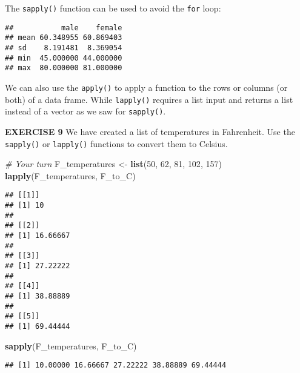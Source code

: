 \documentclass[
]{article}
\newenvironment{Shaded}{\begin{snugshade}}{\end{snugshade}}
\newcommand{\CommentTok}[1]{\textcolor[rgb]{0.56,0.35,0.01}{\textit{#1}}}
\newcommand{\DecValTok}[1]{\textcolor[rgb]{0.00,0.00,0.81}{#1}}
\newcommand{\KeywordTok}[1]{\textcolor[rgb]{0.13,0.29,0.53}{\textbf{#1}}}
\newcommand{\NormalTok}[1]{#1}
\newcommand{\OperatorTok}[1]{\textcolor[rgb]{0.81,0.36,0.00}{\textbf{#1}}}
\newcommand{\StringTok}[1]{\textcolor[rgb]{0.31,0.60,0.02}{#1}}
\begin{document}
The \texttt{sapply()} function can be used to avoid the \texttt{for}
loop:

\begin{Shaded}
\end{Shaded}

\begin{verbatim}
##           male    female
## mean 60.348955 60.869403
## sd    8.191481  8.369054
## min  45.000000 44.000000
## max  80.000000 81.000000
\end{verbatim}

We can also use the \texttt{apply()} to apply a function to the rows or
columns (or both) of a data frame. While \texttt{lapply()} requires a
list input and returns a list instead of a vector as we saw for
\texttt{sapply()}.

\textbf{EXERCISE 9} We have created a list of temperatures in
Fahrenheit. Use the \texttt{sapply()} or \texttt{lapply()} functions to
convert them to Celsius.

\begin{Shaded}
\begin{Highlighting}[]
\CommentTok{# Your turn}
\NormalTok{F_temperatures <-}\StringTok{ }\KeywordTok{list}\NormalTok{(}\DecValTok{50}\NormalTok{, }\DecValTok{62}\NormalTok{, }\DecValTok{81}\NormalTok{, }\DecValTok{102}\NormalTok{, }\DecValTok{157}\NormalTok{) }
\KeywordTok{lapply}\NormalTok{(F_temperatures, F_to_C)}
\end{Highlighting}
\end{Shaded}

\begin{verbatim}
## [[1]]
## [1] 10
## 
## [[2]]
## [1] 16.66667
## 
## [[3]]
## [1] 27.22222
## 
## [[4]]
## [1] 38.88889
## 
## [[5]]
## [1] 69.44444
\end{verbatim}

\begin{Shaded}
\begin{Highlighting}[]
\KeywordTok{sapply}\NormalTok{(F_temperatures, F_to_C)}
\end{Highlighting}
\end{Shaded}

\begin{verbatim}
## [1] 10.00000 16.66667 27.22222 38.88889 69.44444
\end{verbatim}
\end{document}
